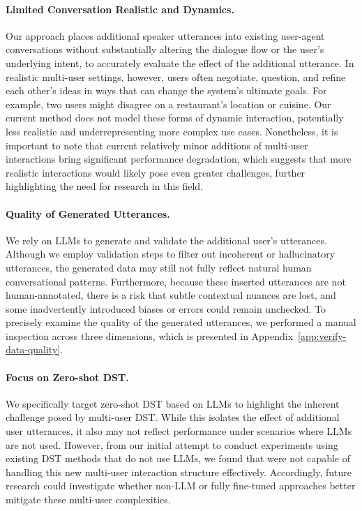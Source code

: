 \documentclass[11pt]{article}
\begin{document}
\paragraph{Limited Conversation Realistic and Dynamics.} 
Our approach places additional speaker utterances into existing user-agent conversations without substantially altering the dialogue flow or the user’s underlying intent, to accurately evaluate the effect of the additional utterance. In realistic multi-user settings, however, users often negotiate, question, and refine each other’s ideas in ways that can change the system’s ultimate goals. For example, two users might disagree on a restaurant’s location or cuisine. Our current method does not model these forms of dynamic interaction, potentially less realistic and underrepresenting more complex use cases. Nonetheless, it is important to note that current relatively minor additions of multi-user interactions bring significant performance degradation, which suggests that more realistic interactions would likely pose even greater challenges, further highlighting the need for research in this field.

\paragraph{Quality of Generated Utterances.}
We rely on LLMs to generate and validate the additional user’s utterances. Although we employ validation steps to filter out incoherent or hallucinatory utterances, the generated data may still not fully reflect natural human conversational patterns. Furthermore, because these inserted utterances are not human-annotated, there is a risk that subtle contextual nuances are lost, and some inadvertently introduced biases or errors could remain unchecked. To precisely examine the quality of the generated utterances, we performed a manual inspection across three dimensions, which is presented in Appendix~\ref{app:verify-data-quality}.

\paragraph{Focus on Zero-shot DST.} 
We specifically target zero-shot DST based on LLMs to highlight the inherent challenge posed by multi-user DST. While this isolates the effect of additional user utterances, it also may not reflect performance under scenarios where LLMs are not used. However, from our initial attempt to conduct experiments using existing DST methods that do not use LLMs, we found that were not capable of handling this new multi-user interaction structure effectively. Accordingly, future research could investigate whether non-LLM or fully fine-tuned approaches better mitigate these multi-user complexities.
\end{document}
